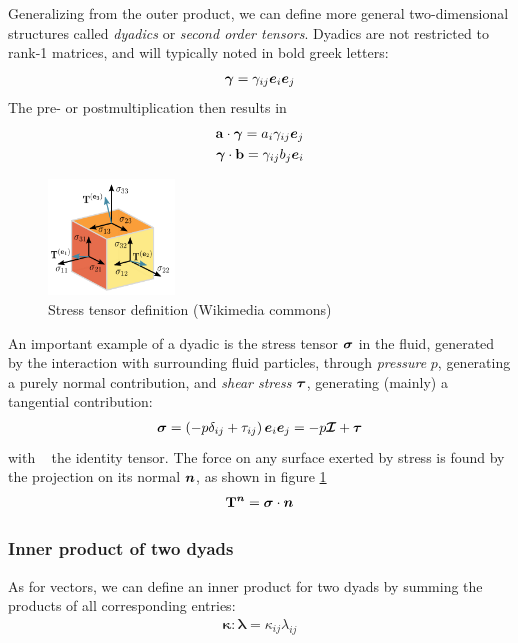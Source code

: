 Generalizing from the outer product, we can define more general
two-dimensional structures called \emph{dyadics} or \emph{second order
  tensors}. Dyadics are not restricted to rank-1 matrices, and will
typically noted in bold greek letters:
\begin{align*}
  \boldsymbol \gamma = \gamma_{ij} \boldsymbol e_{i} \boldsymbol e_{j}
\end{align*}
The pre- or postmultiplication then results in 
\begin{align*}
  \mathbf a \cdot \boldsymbol \gamma = a_i \gamma_{ij} \boldsymbol e_{j} \\
  \boldsymbol \gamma \cdot \mathbf b = \gamma_{ij} b_j \boldsymbol e_{i} \\
\end{align*}
\begin{figure}[!h]
  \centering
  \includegraphics[width=0.3\textwidth]{principles/stress.png}
  \caption{Stress tensor definition (Wikimedia commons)}
  \label{fig:stress}
\end{figure}
An important example of a dyadic is the stress tensor $\boldsymbol {\sigma}$ in
the fluid, generated by the interaction with surrounding fluid
particles, through \emph{pressure} $p$, generating a purely normal
contribution, and \emph{shear stress} $\boldsymbol {\tau}$, generating
(mainly) a tangential contribution:
\begin{align*} 
  \boldsymbol {\sigma} = \left(- p \delta_{ij} + \tau_{ij}\right)
  \boldsymbol e_{i} \boldsymbol e_{j} = -p \boldsymbol {\mathcal I} + \boldsymbol {\tau}
\end{align*}
with \identityT~ the identity tensor.  The force on any surface
exerted by stress is found by the projection on its normal $\boldsymbol {n}$, as
shown in figure \ref{fig:stress}
\begin{align*}
  \mathbf T^{\boldsymbol {n}} = \boldsymbol {\sigma} \cdot \boldsymbol {n}
\end{align*}

\subsubsection{Inner product of two dyads}

As for vectors, we can define an inner product for two dyads by summing the products of all corresponding entries:
\begin{align*}
        \boldsymbol \kappa : \boldsymbol \lambda = \kappa_{ij} \lambda_{ij}
\end{align*}

